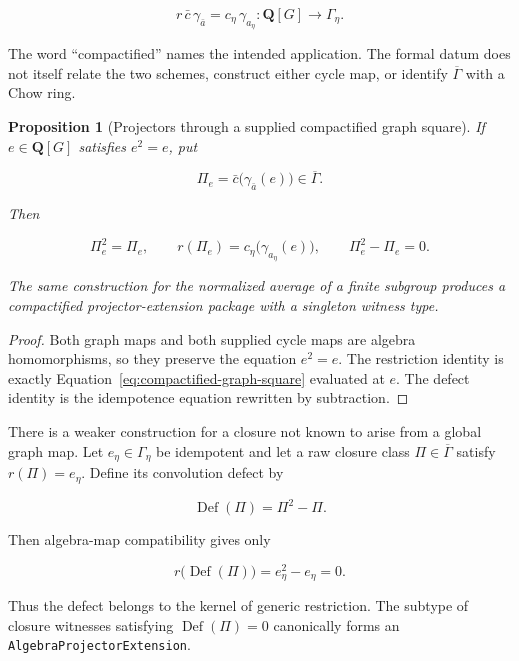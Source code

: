 \documentclass[11pt]{article}
\newtheorem{proposition}[theorem]{Proposition}
\theoremstyle{definition}
\theoremstyle{remark}
\DeclareMathOperator{\Def}{Def}
\newcommand{\Q}{\mathbf Q}
\newcommand{\Geta}{\Gamma_{\eta}}
\newcommand{\Gbar}{\overline{\Gamma}}
\newcommand{\leanpath}[1]{\texttt{\nolinkurl{#1}}}
\begin{document}
\begin{equation}
\label{eq:compactified-graph-square}
  r\,\bar c\,\gamma_{\bar a}
  =c_\eta\,\gamma_{a_\eta}:\Q[G]\longrightarrow\Geta.
\end{equation}

The word ``compactified'' names the intended application.  The formal datum
does not itself relate the two schemes, construct either cycle map, or
identify \(\Gbar\) with a Chow ring.

\begin{proposition}[Projectors through a supplied compactified graph square]
\label{prop:compactified-graph-projector}
If \(e\in\Q[G]\) satisfies \(e^2=e\), put

\[
  \Pi_e=\bar c\bigl(\gamma_{\bar a}(e)\bigr)\in\Gbar.
\]

Then

\[
  \Pi_e^2=\Pi_e,
  \qquad
  r(\Pi_e)=c_\eta\bigl(\gamma_{a_\eta}(e)\bigr),
  \qquad
  \Pi_e^2-\Pi_e=0.
\]

The same construction for the normalized average of a finite subgroup
produces a compactified projector-extension package with a singleton witness
type.
\end{proposition}

\begin{proof}
Both graph maps and both supplied cycle maps are algebra homomorphisms, so
they preserve the equation \(e^2=e\).  The restriction identity is exactly
Equation~\eqref{eq:compactified-graph-square} evaluated at \(e\).  The defect
identity is the idempotence equation rewritten by subtraction.
\end{proof}

There is a weaker construction for a closure not known to arise from a
global graph map.  Let \(e_\eta\in\Geta\) be idempotent and let a raw closure
class \(\Pi\in\Gbar\) satisfy \(r(\Pi)=e_\eta\).  Define its convolution
defect by

\[
  \Def(\Pi)=\Pi^2-\Pi.
\]

Then algebra-map compatibility gives only

\begin{equation}
\label{eq:defect-restricts-zero}
  r\bigl(\Def(\Pi)\bigr)
  =e_\eta^2-e_\eta=0.
\end{equation}

Thus the defect belongs to the kernel of generic restriction.  The subtype
of closure witnesses satisfying \(\Def(\Pi)=0\) canonically forms an
\leanpath{AlgebraProjectorExtension}.
\end{document}
